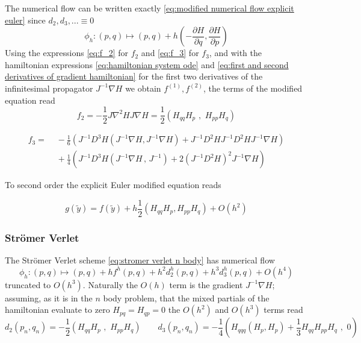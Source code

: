 \documentclass[12pt]{article}
\begin{document}
The numerical flow can be written exactly \eqref{eq:modified numerical flow explicit euler} since $d_2,d_3,... \equiv 0$
\begin{equation}\label{eq:modified numerical flow explicit euler}
    \phi_h : (p,q) \mapsto (p,q) + h\left( -\frac{\partial H}{\partial q}, \frac{\partial H}{\partial p} \right)
\end{equation}
Using the expressions \eqref{eq:f_2} for $f_2$ and \eqref{eq:f_3} for $f_3$, and with the hamiltonian expressions \eqref{eq:hamiltonian system ode} and \eqref{eq:first and second derivatives of gradient hamiltonian} for the first two derivatives of the infinitesimal propagator $J^{-1}\nabla H$ we obtain $f^{(1)},f^{(2)}$, the terms of the modified equation read
\begin{equation}\label{eq:modified equation general formula explicit euler f2}
    f_2 = -\frac{1}{2}J\nabla^2HJ\nabla H = \frac{1}{2}\left( H_{qq}H_p \,\,,\,\, H_{pp}H_q \right)
\end{equation}

\begin{equation}\label{eq:modified equation general formula explicit euler f3}
\begin{split}
    f_3 = &\,\, -\frac{1}{6}\left( 
    J^{-1}D^3H \left( J^{-1}\nabla H , J^{-1}\nabla H\right) + J^{-1}D^2H J^{-1}D^2H J^{-1}\nabla H\right)\\
    &\,\, + \frac{1}{4} \left( 
    J^{-1}D^3H (J^{-1}\nabla H\, ,\, J^{-1}) + 2\left( J^{-1}D^2H \right)^2 J^{-1}\nabla H
    \right)
\end{split}
\end{equation}

To second order the explicit Euler modified equation reads

$$
g(\widetilde y) = f(\widetilde y) + h\frac{1}{2}\left( H_{qq}H_p , H_{pp}H_q \right) + O(h^2)
$$

\subsubsection{Str\"omer Verlet}
The Str\"omer Verlet scheme \eqref{eq:stromer verlet n body} has numerical flow 
$$\phi_h : (p,q) \mapsto (p,q) + hf^h(p,q) + h^2d_2^h(p,q) + h^3d_3^h(p,q) + O(h^4)$$
truncated to $O(h^3)$. Naturally the $O(h)$ term is the gradient $J^{-1}\nabla H$; assuming, as it is in the $n$ body problem, that the mixed partials of the hamiltonian evaluate to zero $H_{pq}=H_{qp}=0$ the $O(h^2)$ and $O(h^3)$ terms read
\begin{equation}\label{eq:stromer verlet d2 and d3}
    d_2(p_n,q_n) = -\frac{1}{2}\left( 
    H_{qq}H_p \,\,
    ,\,\,
    H_{pp}H_q \right)
    \qquad
    d_3(p_n,q_n) = -\frac{1}{4}\left(
    H_{qqq}(H_p,H_p) + \frac{1}{3}H_{qq}H_{pp}H_q
    \,\,,\,\, 0\right)
\end{equation}
\end{document}
